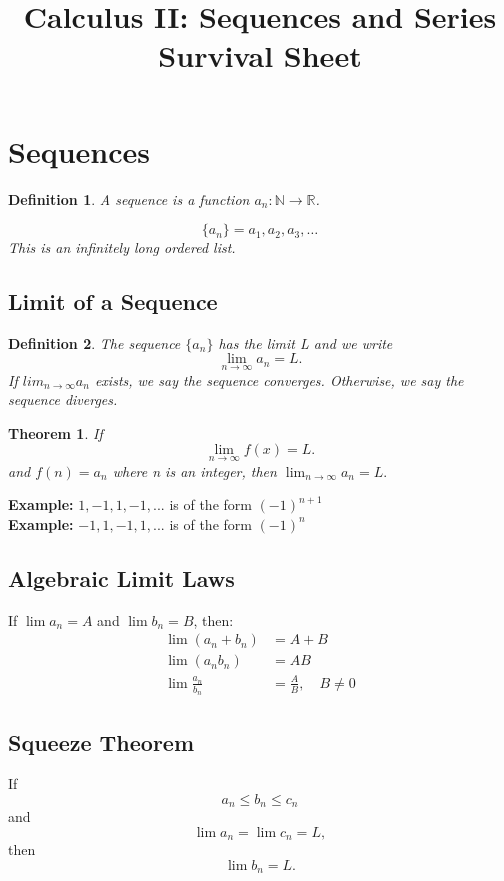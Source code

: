 \documentclass[11pt]{article}
\title{Calculus II: Sequences and Series Survival Sheet}
\author{}
\date{}
\newtheorem{theorem}{Theorem}[section]
\theoremstyle{mydef}
\newtheorem{definition}{Definition}
\begin{document}
\maketitle

\section*{Sequences}

\begin{definition}
A \textit{sequence} is a function $a_n : \mathbb{N} \to \mathbb{R}$.

\[
\{a_n\} = a_1, a_2, a_3, \dots
\]
This is an infinitely long ordered list. 
\end{definition}
\subsection*{Limit of a Sequence}

\begin{definition}
    The sequence $\{a_n\}$ has the \textit{limit} L and we write
\[
\lim_{n \to \infty} a_n = L.
\]
If $lim_{n \to \infty} a_n$ exists, we say the sequence \textit{converges}. Otherwise, we say the sequence \textit{diverges}.
\end{definition}

\begin{theorem}
    If 
\[
\lim_{n \to \infty} f(x) = L.
\] and $f(n)=a_n$ where n is an integer, then $
\lim_{n \to \infty} a_n = L.$
\end{theorem}

\textbf{Example:} $1,-1,1,-1,...$ is of the form $(-1)^{n+1}$\\
\textbf{Example:} $-1,1,-1,1,...$ is of the form $(-1)^n$
\subsection*{Algebraic Limit Laws}
If $\lim a_n = A$ and $\lim b_n = B$, then:
\begin{align*}
\lim (a_n + b_n) &= A+B \\
\lim (a_n b_n) &= AB \\
\lim \frac{a_n}{b_n} &= \frac{A}{B}, \quad B\neq0
\end{align*}

\subsection*{Squeeze Theorem}
If
\[
a_n \le b_n \le c_n
\]
and
\[
\lim a_n = \lim c_n = L,
\]
then
\[
\lim b_n = L.
\]
\end{document}
